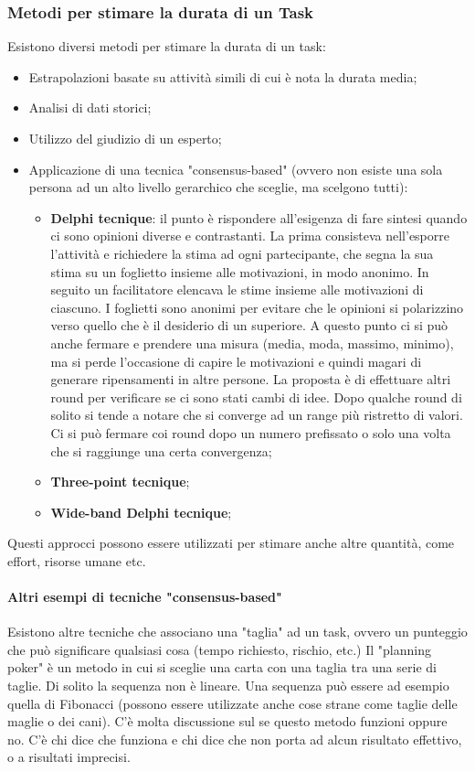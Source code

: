 \subsubsection{Metodi per stimare la durata di un Task}
Esistono diversi metodi per stimare la durata di un task:
\begin{itemize}
	\item Estrapolazioni basate su attività simili di cui è nota la durata media;
	\item Analisi di dati storici;
	\item Utilizzo del giudizio di un esperto;
	\item Applicazione di una tecnica "consensus-based" (ovvero non esiste una sola persona ad un alto livello gerarchico che sceglie, ma scelgono tutti):
	\begin{itemize}
		\item \textbf{Delphi tecnique}: il punto è rispondere all'esigenza di fare sintesi quando ci sono opinioni diverse e contrastanti. La prima consisteva nell'esporre l'attività e richiedere la stima ad ogni partecipante, che segna la sua stima su un foglietto insieme alle motivazioni, in modo anonimo. In seguito un facilitatore elencava le stime insieme alle motivazioni di ciascuno. I foglietti sono anonimi per evitare che le opinioni si polarizzino verso quello che è il desiderio di un superiore. A questo punto ci si può anche fermare e prendere una misura (media, moda, massimo, minimo), ma si perde l'occasione di capire le motivazioni e quindi magari di generare ripensamenti in altre persone. La proposta è di effettuare altri round per verificare se ci sono stati cambi di idee. Dopo qualche round di solito si tende a notare che si converge ad un range più ristretto di valori. Ci si può fermare coi round dopo un numero prefissato o solo una volta che si raggiunge una certa convergenza;
		\item \textbf{Three-point tecnique};
		\item \textbf{Wide-band Delphi tecnique};
	\end{itemize}
\end{itemize}
Questi approcci possono essere utilizzati per stimare anche altre quantità, come effort, risorse umane etc.

\paragraph{Altri esempi di tecniche "consensus-based"}
Esistono altre tecniche che associano una "taglia" ad un task, ovvero un punteggio che può significare qualsiasi cosa (tempo richiesto, rischio, etc.)
Il "planning poker" è un metodo in cui si sceglie una carta con una taglia tra una serie di taglie. Di solito la sequenza non è lineare. Una sequenza può essere ad esempio quella di Fibonacci (possono essere utilizzate anche cose strane come taglie delle maglie o dei cani). C'è molta discussione sul se questo metodo funzioni oppure no. C'è chi dice che funziona e chi dice che non porta ad alcun risultato effettivo, o a risultati imprecisi.

